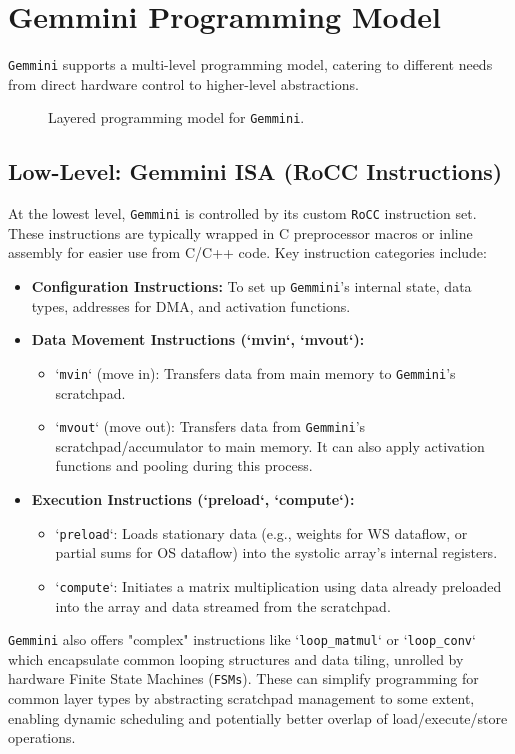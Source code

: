 \section{Gemmini Programming Model}
\label{sec:gemmini_programming_model}
\texttt{Gemmini} supports a multi-level programming model, catering to different needs from direct hardware control to higher-level abstractions.

\begin{figure}[h!]
    \centering
    \caption{Layered programming model for \texttt{Gemmini}.}
    \label{fig:gemmini_prog_model}
\end{figure}

\subsection{Low-Level: Gemmini ISA (RoCC Instructions)}
\label{subsec:gemmini_low_level_isa}
At the lowest level, \texttt{Gemmini} is controlled by its custom \texttt{RoCC} instruction set. These instructions are typically wrapped in C preprocessor macros or inline assembly for easier use from C/C++ code. Key instruction categories include:
\begin{itemize}
    \item \textbf{Configuration Instructions:} To set up \texttt{Gemmini}'s internal state, data types, addresses for DMA, and activation functions.
    \item \textbf{Data Movement Instructions (`mvin`, `mvout`):}
        \begin{itemize}
            \item `\texttt{mvin}` (move in): Transfers data from main memory to \texttt{Gemmini}'s scratchpad.
            \item `\texttt{mvout}` (move out): Transfers data from \texttt{Gemmini}'s scratchpad/accumulator to main memory. It can also apply activation functions and pooling during this process.
        \end{itemize}
    \item \textbf{Execution Instructions (`preload`, `compute`):}
        \begin{itemize}
            \item `\texttt{preload}`: Loads stationary data (e.g., weights for WS dataflow, or partial sums for OS dataflow) into the systolic array's internal registers.
            \item `\texttt{compute}`: Initiates a matrix multiplication using data already preloaded into the array and data streamed from the scratchpad.
        \end{itemize}
\end{itemize}
\texttt{Gemmini} also offers "complex" instructions like `\texttt{loop\_matmul}` or `\texttt{loop\_conv}` which encapsulate common looping structures and data tiling, unrolled by hardware Finite State Machines (\texttt{FSMs}). These can simplify programming for common layer types by abstracting scratchpad management to some extent, enabling dynamic scheduling and potentially better overlap of load/execute/store operations.

